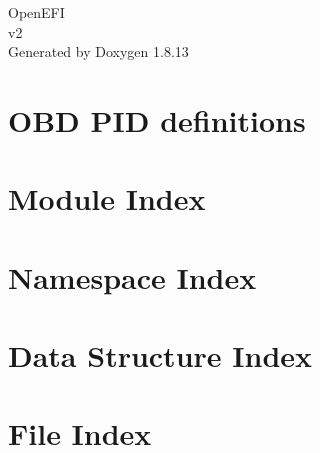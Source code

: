 \documentclass[twoside]{book}
\newcommand{\+}{\discretionary{\mbox{\scriptsize$\hookleftarrow$}}{}{}}
\newcommand{\clearemptydoublepage}{%
  \newpage{\pagestyle{empty}\cleardoublepage}%
}
\begin{document}
\hypersetup{pageanchor=false,
             bookmarksnumbered=true,
             pdfencoding=unicode
            }
\begin{titlepage}
\vspace*{7cm}
\begin{center}%
{\Large Open\+E\+FI \\[1ex]\large v2 }\\
\vspace*{1cm}
{\large Generated by Doxygen 1.8.13}\\
\end{center}
\end{titlepage}
\clearemptydoublepage
{}
\tableofcontents
\clearemptydoublepage
{}
\hypersetup{pageanchor=true}

\chapter{O\+BD P\+ID definitions}
\label{OBD}

\chapter{Module Index}

\chapter{Namespace Index}

\chapter{Data Structure Index}

\chapter{File Index}

\end{document}
